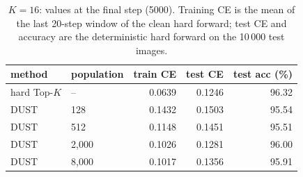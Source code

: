 \begin{table}[H]
\centering
\caption{$K = 16$: values at the final step (5000). Training CE is the mean of the last 20-step window of the clean hard forward; test CE and accuracy are the deterministic hard forward on the 10\,000 test images.}
\label{tab:k16}
\begin{tabular}{llrrr}
\toprule
    method & population & train CE & test CE & test acc (\%) \\
\midrule
    hard Top-$K$ & -- & 0.0639 & 0.1246 & 96.32 \\
    DUST & 128 & 0.1432 & 0.1503 & 95.54 \\
    DUST & 512 & 0.1148 & 0.1451 & 95.51 \\
    DUST & 2,000 & 0.1026 & 0.1281 & 96.00 \\
    DUST & 8,000 & 0.1017 & 0.1356 & 95.91 \\
\bottomrule
\end{tabular}
\end{table}
